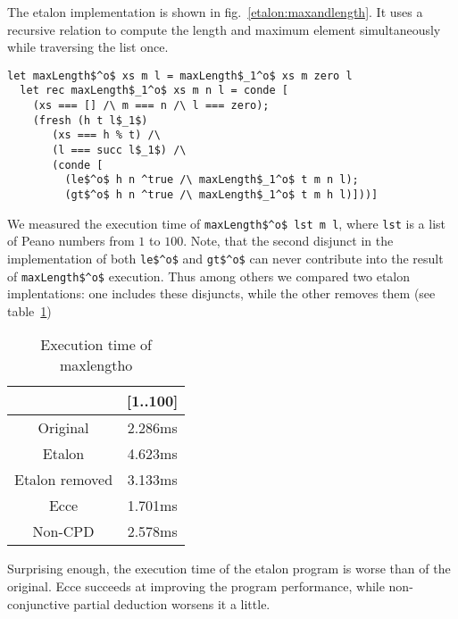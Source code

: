 The etalon implementation is shown in fig.~\ref{etalon:maxandlength}.
It uses a recursive relation to compute the length and maximum element simultaneously while traversing the list once.

\begin{figure*}[!h]
  \centering
  \begin{minipage}{0.7\textwidth}
\begin{lstlisting}[label={etalon:maxandlength}, caption={Etalon implementation of maxlengtho}, captionpos=b, frame=tb]
  let maxLength$^o$ xs m l = maxLength$_1^o$ xs m zero l
  let rec maxLength$_1^o$ xs m n l = conde [
    (xs === [] /\ m === n /\ l === zero);
    (fresh (h t l$_1$)
       (xs === h % t) /\
       (l === succ l$_1$) /\
       (conde [
         (le$^o$ h n ^true /\ maxLength$_1^o$ t m n l);
         (gt$^o$ h n ^true /\ maxLength$_1^o$ t m h l)]))]
  \end{lstlisting}
\end{minipage}
\end{figure*}

We measured the execution time of \lstinline{maxLength$^o$ lst m l}, where \lstinline{lst} is a list of Peano numbers from $1$ to $100$.
Note, that the second disjunct in the implementation of both \lstinline{le$^o$} and \lstinline{gt$^o$} can never contribute into the result of \lstinline{maxLength$^o$} execution.
Thus among others we compared two etalon implentations: one includes these disjuncts, while the other removes them (see table~\ref{tbl:maxlen})


\begin{table}
  \centering
  \begin{tabular}{c||c}
                   & [1..100] \\ \hline\hline
  Original         & 2.286ms  \\ \hline
  Etalon           & 4.623ms  \\ \hline
  Etalon removed   & 3.133ms  \\ \hline
  Ecce             & 1.701ms  \\ \hline
  Non-CPD          & 2.578ms
  \end{tabular}

  \caption{Execution time of maxlengtho}
  \label{tbl:maxlen}
\end{table}

Surprising enough, the execution time of the etalon program is worse than of the original.
Ecce succeeds at improving the program performance, while non-conjunctive partial deduction worsens it a little.
\todo{why}

